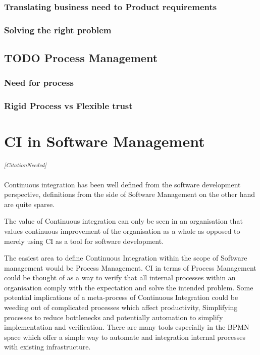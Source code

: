\documentclass[10pt,conference]{IEEEtran}
\newcommand{\citationneeded}{\textsuperscript{\textit{[CitationNeeded]}}}
\begin{document}
\subsubsection*{Translating business need to Product requirements}
\subsubsection*{Solving the right problem}

\subsection*{TODO Process Management}
\subsubsection*{Need for process}
\subsubsection*{Rigid Process vs Flexible trust} \cite{benner_exploitation_2003}

\section*{CI in Software Management}

\citationneeded

Continuous integration has been well defined from the software development perspective, definitions from the side of Software Management on the other hand are quite sparse. 

The value of Continuous integration can only be seen in an organisation that values continuous improvement of the organisation as a whole as opposed to merely using CI as a tool for software development.

The easiest area to define Continuous Integration within the scope of Software management would be Process Management. CI in terms of Process Management could be thought of as a way to verify that all internal processes within an organisation comply with the expectation and solve the intended problem. Some potential implications of a meta-process of Continuous Integration could be weeding out of complicated processes which affect productivity, Simplifying processes to reduce bottlenecks and potentially automation to simplify implementation and verification. There are many tools especially in the BPMN space which offer a simple way to automate and integration internal processes with existing infrastructure. 
\end{document}
